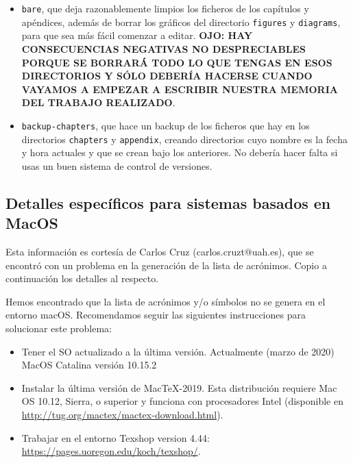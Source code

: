 \begin{itemize}
\begin{itemize}
  \item \texttt{bare}, que deja razonablemente limpios los ficheros de
    los capítulos y apéndices, además de borrar los gráficos del
    directorio \texttt{figures} y \texttt{diagrams}, para que sea más
    fácil comenzar a editar. \textbf{OJO: HAY CONSECUENCIAS NEGATIVAS NO
      DESPRECIABLES PORQUE SE BORRARÁ TODO LO QUE TENGAS EN ESOS
      DIRECTORIOS Y SÓLO DEBERÍA HACERSE CUANDO VAYAMOS A EMPEZAR A
      ESCRIBIR NUESTRA MEMORIA DEL TRABAJO REALIZADO}.

  \item \texttt{backup-chapters}, que hace un backup de los ficheros que
    hay en los directorios \texttt{chapters} y \texttt{appendix},
    creando directorios cuyo nombre es la fecha y hora actuales y que se
    crean bajo los anteriores. No debería hacer falta si usas un buen
    sistema de control de versiones.
  \end{itemize}

\end{itemize}


\subsection{Detalles específicos para sistemas basados en MacOS}
\label{sec:detall-espec-para}

Esta información es cortesía de Carlos Cruz (carlos.cruzt@uah.es), que
se encontró con un problema en la generación de la lista de
acrónimos. Copio a continuación los detalles al respecto.

Hemos encontrado que la lista de acrónimos y/o símbolos no se genera en
el entorno macOS. Recomendamos seguir las siguientes instrucciones para
solucionar este problema:

\begin{itemize}
\item Tener el SO actualizado a la última versión. Actualmente (marzo de
  2020) MacOS Catalina versión 10.15.2
\item Instalar la última versión de MacTeX-2019. Esta distribución
  requiere Mac OS 10.12, Sierra, o superior y funciona con procesadores
  Intel (disponible en
  \href{http://tug.org/mactex/mactex-download.html}{http://tug.org/mactex/mactex-download.html}).
\item Trabajar en el entorno Texshop version 4.44:
  \href{https://pages.uoregon.edu/koch/texshop/}{https://pages.uoregon.edu/koch/texshop/}.
\end{itemize}

